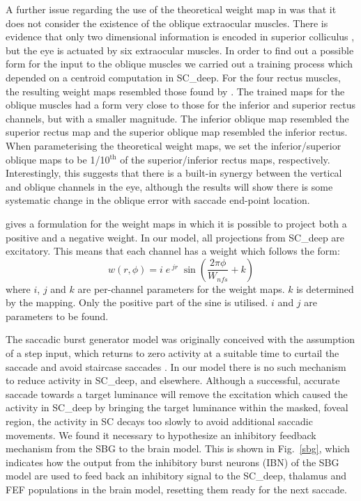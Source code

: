 \documentclass{frontiersSCNS}
\begin{document}
A further issue regarding the use of the theoretical weight map
in \cite{tabareau_geometry_2007} was that it does not consider the
existence of the oblique extraocular muscles. There is evidence that
only two dimensional information is encoded in superior
colliculus
\citep{wurtz_activity_1972,hepp_monkey_1993,van_opstal_two-rather_1991},
but the eye is actuated by six extraocular muscles. In order to find
out a possible form for the input to the oblique muscles we carried
out a training process
which depended on a centroid computation in SC\_deep. For the four
rectus muscles, the resulting weight maps resembled those found by
\cite{arai_two-dimensional_1994}. The trained
maps for the oblique muscles had a form very close to those for the
inferior and superior rectus channels, but with a smaller magnitude.
The inferior oblique map resembled the superior rectus map and the
superior oblique map resembled the inferior rectus. When parameterising
the theoretical weight maps, we set the inferior/superior
oblique maps to be 1/10$^{\mathrm{th}}$ of the superior/inferior rectus
maps, respectively. Interestingly, this suggests that there is a built-in
synergy between the vertical and oblique channels in the eye, although
the results will show there is some systematic change in the oblique error
with saccade end-point location.

\cite{tabareau_geometry_2007} gives a formulation for the weight maps
in which it is possible to project both a positive and a negative
weight. In our model, all projections from SC\_deep are excitatory.
This means that each channel has a weight which follows the form:
\begin{equation} \label{eq:weightmaps}
w(r,\phi) = i\;e\,^{jr}\;\sin\left(\frac{2\pi\phi}{W_{nfs}} + k\right)
\end{equation}
where $i$, $j$ and $k$ are per-channel parameters for the weight
maps. $k$ is determined by the mapping. Only the positive part of the
sine is utilised. $i$ and $j$ are parameters to be found.

The saccadic burst generator model was originally conceived with the
assumption of a step input, which returns to zero activity at a
suitable time to curtail the saccade and avoid staircase
saccades \citep{gancarz_neural_1998}. In our model there is no such
mechanism to reduce activity in SC\_deep, and elsewhere.  Although a
successful, accurate saccade towards a target luminance will remove
the excitation which caused the activity in SC\_deep by bringing the
target luminance within the masked, foveal region, the activity in SC
decays too slowly to avoid additional saccadic movements. We found it
necessary to hypothesize an inhibitory feedback mechanism from the SBG
to the brain model.  This is shown in Fig.~\ref{sbg}, which indicates
how the output from the inhibitory burst neurons (IBN) of the SBG
model are used to feed back an inhibitory signal to the SC\_deep,
thalamus and FEF populations in the brain model, resetting them ready
for the next saccade.
\end{document}
